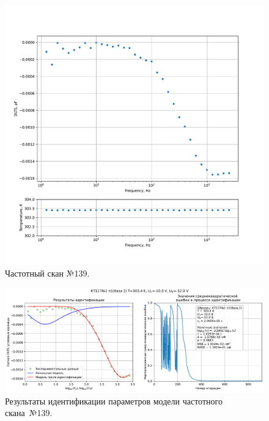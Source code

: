 \begin{figure}[!ht]
    \centering
    \includegraphics[width=1\textwidth]{../plots/КТ117№1_п1(база 2)_2500Гц-1Гц_1пФ_+30С_-10В-12В_20мВ_20мкс_шаг_0,1.pdf}
    \caption{Частотный скан №139.}
    \label{pic:frequency_scan_139}
\end{figure}

\begin{figure}[!ht]
    \centering
    \includegraphics[width=1\textwidth]{../plots/КТ117№1_п1(база 2)_2500Гц-1Гц_1пФ_+30С_-10В-12В_20мВ_20мкс_шаг_0,1_model.pdf}
    \caption{Результаты идентификации параметров модели частотного скана~№139.}
    \label{pic:frequency_scan_model139}
\end{figure}

\pagebreak



